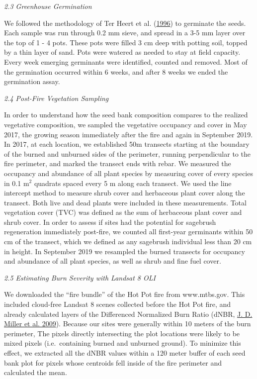 \documentclass[
  12pt,
]{article}
\begin{document}
\emph{2.3 Greenhouse Germination}

We followed the methodology of Ter Heert et al.
(\protect\hyperlink{ref-Heerdt1996}{1996}) to germinate the seeds. Each
sample was run through 0.2 mm sieve, and spread in a 3-5 mm layer over
the top of 1 - 4 pots. These pots were filled 3 cm deep with potting
soil, topped by a thin layer of sand. Pots were watered as needed to
stay at field capacity. Every week emerging germinants were identified,
counted and removed. Most of the germination occurred within 6 weeks,
and after 8 weeks we ended the germination assay.

\emph{2.4 Post-Fire Vegetation Sampling}

In order to understand how the seed bank composition compares to the
realized vegetative composition, we sampled the vegetative occupancy and
cover in May 2017, the growing season immediately after the fire and
again in September 2019. In 2017, at each location, we established 50m
transects starting at the boundary of the burned and unburned sides of
the perimeter, running perpendicular to the fire perimeter, and marked
the transect ends with rebar. We measured the occupancy and abundance of
all plant species by measuring cover of every species in 0.1 m\(^2\)
quadrats spaced every 5 m along each transect. We used the line
intercept method to measure shrub cover and herbaceous plant cover along
the transect. Both live and dead plants were included in these
measurements. Total vegetation cover (TVC) was defined as the sum of
herbaceous plant cover and shrub cover. In order to assess if sites had
the potential for sagebrush regeneration immediately post-fire, we
counted all first-year germinants within 50 cm of the transect, which we
defined as any sagebrush individual less than 20 cm in height. In
September 2019 we resampled the burned transects for occupancy and
abundance of all plant species, as well as shrub and fine fuel cover.

\emph{2.5 Estimating Burn Severity with Landsat 8 OLI}

We downloaded the ``fire bundle'' of the Hot Pot fire from www.mtbs.gov.
This included cloud-free Landsat 8 scenes collected before the Hot Pot
fire, and already calculated layers of the Differenced Normalized Burn
Ratio (dNBR, \protect\hyperlink{ref-Miller2009}{J. D. Miller et al.
2009}). Because our sites were generally within 10 meters of the burn
perimeter, The pixels directly intersecting the plot locations were
likely to be mixed pixels (i.e.~containing burned and unburned ground).
To minimize this effect, we extracted all the dNBR values within a 120
meter buffer of each seed bank plot for pixels whose centroids fell
inside of the fire perimeter and calculated the mean.
\end{document}

